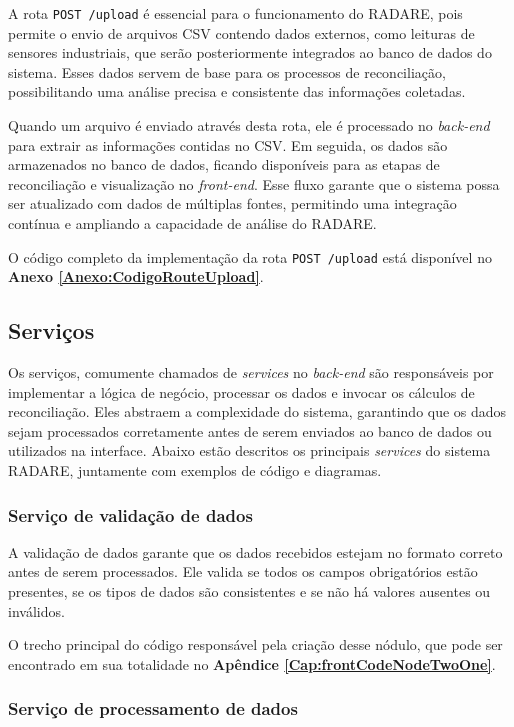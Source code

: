 A rota \texttt{POST /upload} é essencial para o funcionamento do RADARE, pois permite o envio de arquivos CSV contendo dados externos, como leituras de sensores industriais, que serão posteriormente integrados ao banco de dados do sistema. Esses dados servem de base para os processos de reconciliação, possibilitando uma análise precisa e consistente das informações coletadas.

Quando um arquivo é enviado através desta rota, ele é processado no \textit{back-end} para extrair as informações contidas no CSV. Em seguida, os dados são armazenados no banco de dados, ficando disponíveis para as etapas de reconciliação e visualização no \textit{front-end}. Esse fluxo garante que o sistema possa ser atualizado com dados de múltiplas fontes, permitindo uma integração contínua e ampliando a capacidade de análise do RADARE.

O código completo da implementação da rota \texttt{POST /upload} está disponível no \textbf{Anexo \ref{Anexo:CodigoRouteUpload}}.

\subsection{Serviços}

Os serviços, comumente chamados de \textit{services} no \textit{back-end} são responsáveis por implementar a lógica de negócio, processar os dados e invocar os cálculos de reconciliação. Eles abstraem a complexidade do sistema, garantindo que os dados sejam processados corretamente antes de serem enviados ao banco de dados ou utilizados na interface. Abaixo estão descritos os principais \textit{services} do sistema RADARE, juntamente com exemplos de código e diagramas.


\subsubsection{Serviço de validação de dados}

A validação de dados garante que os dados recebidos estejam no formato correto antes de serem processados. Ele valida se todos os campos obrigatórios estão presentes, se os tipos de dados são consistentes e se não há valores ausentes ou inválidos.

O trecho principal do código responsável pela criação desse nódulo, que pode ser encontrado em sua totalidade no \textbf{Apêndice \ref{Cap:frontCodeNodeTwoOne}}.

\subsubsection{Serviço de processamento de dados}

